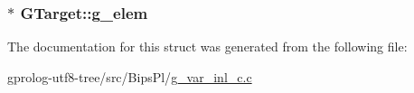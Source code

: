 \subsubsection[{\texorpdfstring{g\+\_\+elem}{g_elem}}]{$\ast$ G\+Target\+::g\+\_\+elem}\hypertarget{structGTarget_a057eea84bfa93fdfb38a7bf7d1bea531}{}\label{structGTarget_a057eea84bfa93fdfb38a7bf7d1bea531}


The documentation for this struct was generated from the following file\+:\begin{DoxyCompactItemize}
\item 
gprolog-\/utf8-\/tree/src/\+Bips\+Pl/\hyperlink{g__var__inl__c_8c}{g\+\_\+var\+\_\+inl\+\_\+c.\+c}\end{DoxyCompactItemize}
